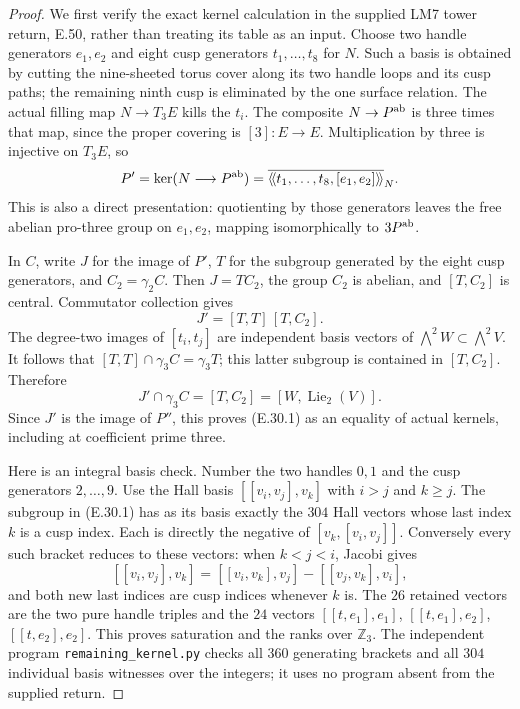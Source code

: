 \documentclass[11pt,oneside]{article}
\begin{document}
\begin{proof}
We first verify the exact kernel calculation in the supplied
LM7 tower return, E.50, rather than treating its table as an input.
Choose two handle generators $e_1,e_2$ and eight cusp generators
$t_1,\ldots,t_8$ for $N$. Such a basis is obtained by cutting the
nine-sheeted torus cover along its two handle loops and its cusp
paths; the remaining ninth cusp is eliminated by the one surface
relation. The actual filling map $N\to T_3E$ kills the $t_i$.
The composite $N\to P^{\rm ab}$ is three times that map, since the
proper covering is $[3]:E\to E$. Multiplication by three is
injective on $T_3E$, so
\[
 P'=\ker(N\longrightarrow P^{\rm ab})
    =\overline{\langle\!\langle t_1,\ldots,t_8,[e_1,e_2]
                              \rangle\!\rangle}_N.
\]
This is also a direct presentation: quotienting by those generators
leaves the free abelian pro-three group on $e_1,e_2$, mapping
isomorphically to $3P^{\rm ab}$.

In $C$, write $J$ for the image of $P'$, $T$ for the subgroup
generated by the eight cusp generators, and $C_2=\gamma_2C$.
Then $J=T C_2$, the group $C_2$ is abelian, and $[T,C_2]$
is central. Commutator collection gives
\[
 J'=[T,T]\,[T,C_2].
\]
The degree-two images of $[t_i,t_j]$ are independent basis
vectors of $\bigwedge^2W\subset\bigwedge^2V$.
It follows that $[T,T]\cap\gamma_3C=\gamma_3T$;
this latter subgroup is contained in $[T,C_2]$.
Therefore
\[
 J'\cap\gamma_3C=[T,C_2]=[W,\operatorname{Lie}_2(V)].
\]
Since $J'$ is the image of $P''$, this proves (E.30.1)
as an equality of actual kernels, including at coefficient prime three.

Here is an integral basis check. Number the two handles $0,1$
and the cusp generators $2,\ldots,9$. Use the Hall basis
$[[v_i,v_j],v_k]$ with $i>j$ and $k\ge j$.
The subgroup in (E.30.1) has as its basis exactly the $304$
Hall vectors whose last index $k$ is a cusp index.
Each is directly the negative of $[v_k,[v_i,v_j]]$.
Conversely every such bracket reduces to these vectors:
when $k<j<i$, Jacobi gives
\[
 [[v_i,v_j],v_k]
   =[[v_i,v_k],v_j]-[[v_j,v_k],v_i],
\]
and both new last indices are cusp indices whenever $k$ is.
The $26$ retained vectors are the two pure handle triples
and the $24$ vectors
$[[t,e_1],e_1]$, $[[t,e_1],e_2]$, $[[t,e_2],e_2]$.
This proves saturation and the ranks over $\mathbb Z_3$.
The independent program \texttt{remaining\_kernel.py} checks
all $360$ generating brackets and all $304$ individual basis
witnesses over the integers; it uses no program absent from the
supplied return.


\end{proof}
\end{document}
